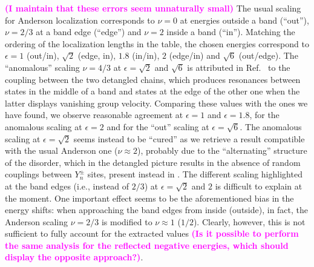 \documentclass[prl,aps,twocolumn,showpacs,superscriptaddress,longbibliography]{revtex4-1}
\newcommand{\tochange}[1]{\textcolor{magenta}{#1}}
\newcommand{\mm}[1]{{\tochange{\footnotesize{\bf (#1)}}}}
\begin{document}
\mm{I maintain that these errors seem unnaturally small} The usual scaling for Anderson localization corresponds to $\nu = 0$ at energies outside a band (``out''), $\nu = 2/3$ at a band edge (``edge'') and $\nu = 2$ inside a band (``in''). Matching the ordering of the localization lengths in the table, the chosen energies correspond to $\epsilon =1$ (out/in), $\sqrt{2}$ (edge, in), $1.8$ (in/in), $2$ (edge/in) and $\sqrt{6}$ (out/edge). The ``anomalous'' scaling $\nu = 4/3$ at $\epsilon = \sqrt{2}$ and $\sqrt{6}$ is attributed in Ref.~\cite{Leykam2017} to the coupling between the two detangled chains, which produces resonances between states in the middle of a band and states at the edge of the other one when the latter displays vanishing group velocity. Comparing these values with the ones we have found, we observe reasonable agreement at $\epsilon = 1$ and $\epsilon = 1.8$, for the anomalous scaling at $\epsilon = 2$ and for the ``out'' scaling at $\epsilon = \sqrt{6}$. The anomalous scaling at $\epsilon = \sqrt{2}$ seems instead to be ``cured'' as we retrieve a result compatible with the usual Anderson one ($\nu  \approx 2$), probably due to the ``alternating'' structure of the disorder, which in the detangled picture results in the absence of random couplings between $Y_n^{\pm}$ sites, present instead in \cite{Leykam2017}. The different scaling highlighted at the band edges (i.e., instead of $2/3$) at $\epsilon = \sqrt{2}$ and $2$ is difficult to explain at the moment. One important effect seems to be the aforementioned bias in the energy shifts: when approaching the band edges from inside (outside), in fact, the Anderson scaling $\nu = 2/3$ is modified to $\nu \approx 1$ ($1/2$). Clearly, however, this is not sufficient to fully account for the extracted values \mm{Is it possible to perform the same analysis for the reflected negative energies, which should display the opposite approach?}.

 
\end{document}
